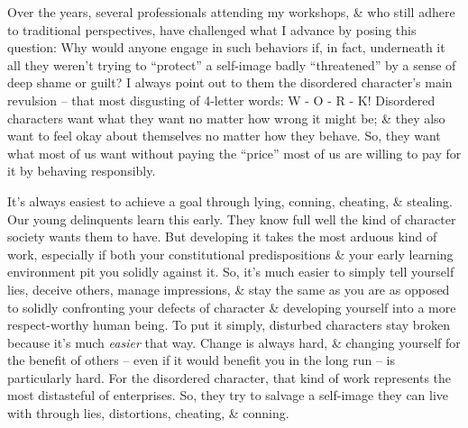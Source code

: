 \documentclass{article}
\numberwithin{equation}{section}
\begin{document}
Over the years, several professionals attending my workshops, \& who still adhere to traditional perspectives, have challenged what I advance by posing this question: Why would anyone engage in such behaviors if, in fact, underneath it all they weren't trying to ``protect'' a self-image badly ``threatened'' by a sense of deep shame or guilt? I always point out to them the disordered character's main revulsion -- that most disgusting of 4-letter words: W - O - R - K! Disordered characters want what they want no matter how wrong it might be; \& they also want to feel okay about themselves no matter how they behave. So, they want what most of us want without paying the ``price'' most of us are willing to pay for it by behaving responsibly.

It's always easiest to achieve a goal through lying, conning, cheating, \& stealing. Our young delinquents learn this early. They know full well the kind of character society wants them to have. But developing it takes the most arduous kind of work, especially if both your constitutional predispositions \& your early learning environment pit you solidly against it. So, it's much easier to simply tell yourself lies, deceive others, manage impressions, \& stay the same as you are as opposed to solidly confronting your defects of character \& developing yourself into a more respect-worthy human being. To put it simply, disturbed characters stay broken because it's much \textit{easier} that way. Change is always hard, \& changing yourself for the benefit of others -- even if it would benefit you in the long run -- is particularly hard. For the disordered character, that kind of work represents the most distasteful of enterprises. So, they try to salvage a self-image they can live with through lies, distortions, cheating, \& conning.
\end{document}
